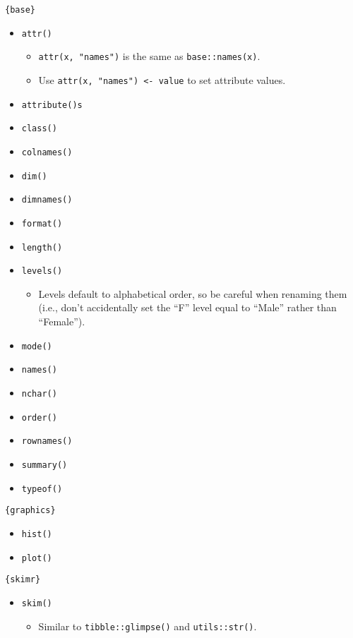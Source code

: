 \documentclass[
]{book}
\providecommand{\tightlist}{%
  \setlength{\itemsep}{0pt}\setlength{\parskip}{0pt}}
\begin{document}
\texttt{\{base\}}

\begin{itemize}
\tightlist
\item
  \texttt{attr()}

  \begin{itemize}
  \tightlist
  \item
    \texttt{attr(x,\ "names")} is the same as \texttt{base::names(x)}.
  \item
    Use \texttt{attr(x,\ "names")\ \textless{}-\ value} to set attribute values.
  \end{itemize}
\item
  \texttt{attribute()s}
\item
  \texttt{class()}
\item
  \texttt{colnames()}
\item
  \texttt{dim()}
\item
  \texttt{dimnames()}
\item
  \texttt{format()}
\item
  \texttt{length()}
\item
  \texttt{levels()}

  \begin{itemize}
  \tightlist
  \item
    Levels default to alphabetical order, so be careful when renaming them (i.e., don't accidentally set the ``F'' level equal to ``Male'' rather than ``Female'').
  \end{itemize}
\item
  \texttt{mode()}
\item
  \texttt{names()}
\item
  \texttt{nchar()}
\item
  \texttt{order()}
\item
  \texttt{rownames()}
\item
  \texttt{summary()}
\item
  \texttt{typeof()}
\end{itemize}

\texttt{\{graphics\}}

\begin{itemize}
\tightlist
\item
  \texttt{hist()}
\item
  \texttt{plot()}
\end{itemize}

\texttt{\{skimr\}}

\begin{itemize}
\tightlist
\item
  \texttt{skim()}

  \begin{itemize}
  \tightlist
  \item
    Similar to \texttt{tibble::glimpse()} and \texttt{utils::str()}.
  \end{itemize}
\end{itemize}
\end{document}
